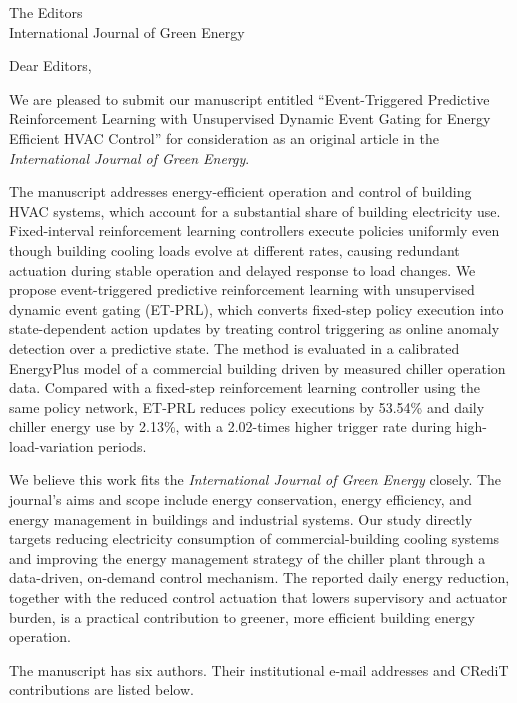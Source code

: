 \documentclass[11pt]{letter}
\begin{document}
\begin{letter}{The Editors\\International Journal of Green Energy}

\opening{Dear Editors,}

We are pleased to submit our manuscript entitled ``Event-Triggered Predictive Reinforcement Learning with Unsupervised Dynamic Event Gating for Energy Efficient HVAC Control'' for consideration as an original article in the \textit{International Journal of Green Energy}.

The manuscript addresses energy-efficient operation and control of building HVAC systems, which account for a substantial share of building electricity use. Fixed-interval reinforcement learning controllers execute policies uniformly even though building cooling loads evolve at different rates, causing redundant actuation during stable operation and delayed response to load changes. We propose event-triggered predictive reinforcement learning with unsupervised dynamic event gating (ET-PRL), which converts fixed-step policy execution into state-dependent action updates by treating control triggering as online anomaly detection over a predictive state. The method is evaluated in a calibrated EnergyPlus model of a commercial building driven by measured chiller operation data. Compared with a fixed-step reinforcement learning controller using the same policy network, ET-PRL reduces policy executions by 53.54\% and daily chiller energy use by 2.13\%, with a 2.02-times higher trigger rate during high-load-variation periods.

We believe this work fits the \textit{International Journal of Green Energy} closely. The journal's aims and scope include energy conservation, energy efficiency, and energy management in buildings and industrial systems. Our study directly targets reducing electricity consumption of commercial-building cooling systems and improving the energy management strategy of the chiller plant through a data-driven, on-demand control mechanism. The reported daily energy reduction, together with the reduced control actuation that lowers supervisory and actuator burden, is a practical contribution to greener, more efficient building energy operation.

The manuscript has six authors. Their institutional e-mail addresses and CRediT contributions are listed below.


\end{letter}
\end{document}
